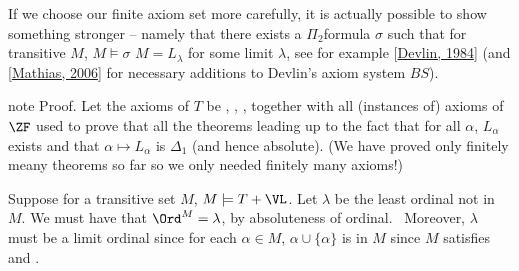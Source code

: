 \documentclass[letterpaper,10pt,english]{jupyterBook}
\begin{document}
\begin{sphinxShadowBox}
\sphinxstylesidebartitle{}

\sphinxAtStartPar
If we choose our finite axiom set more carefully, it is actually possible to show something stronger – namely that there exists a \(\Pi_2\)\sphinxhyphen{}formula \(\sigma\) such that for transitive \(M\), \(M \models \sigma\)  \(M = L_\lambda\) for some limit \(\lambda\), see for example {[}\hyperlink{cite.bibliography:id5}{Devlin, 1984}{]} (and {[}\hyperlink{cite.bibliography:id13}{Mathias, 2006}{]} for necessary additions to Devlin’s axiom system \(BS\)).
\end{sphinxShadowBox}

\begin{sphinxadmonition}{note}
\sphinxAtStartPar
Proof. Let the axioms of \(T\) be , , , together with all (instances of) axioms of \(\ZF\) used to prove that all the theorems leading up to the fact that for all \(\alpha\), \(L_\alpha\)  exists and that \(\alpha \mapsto L_\alpha\) is \(\Delta_1\) (and hence absolute). (We have proved only finitely meany theorems so far so we only needed finitely many axioms!)

\sphinxAtStartPar
Suppose for a transitive set \(M\), \(M\models T + \VL\). Let \(\lambda\) be the least ordinal not in \(M\).
We must have that \(\Ord^M = \lambda\), by absoluteness of
ordinal.  Moreover, \(\lambda\) must be a limit ordinal since for each \(\alpha \in M\), \(\alpha \cup \{\alpha\}\) is in \(M\) since \(M\) satisfies  and .


\end{sphinxadmonition}
\end{document}
